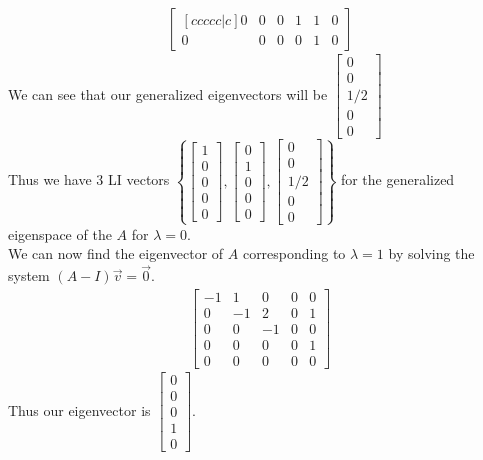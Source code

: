 \documentclass[answers,12pt,addpoints]{exam}
\begin{document}
\begin{questions}
\begin{solution}
\begin{align*}
\begin{bmatrix}[ccccc|c]
                0 & 0 & 0 & 1 & 1 & 0 \\
                0 & 0 & 0 & 0 & 1 & 0
            \end{bmatrix}
        \end{align*}
        We can see that our generalized eigenvectors will be $\begin{bmatrix}
            0 \\ 0 \\ 1/2 \\ 0 \\ 0
        \end{bmatrix}$\\
        Thus we have 3 LI vectors $\left\{ \begin{bmatrix} 1\\ 0\\ 0\\ 0\\ 0 \end{bmatrix}, \begin{bmatrix} 0\\ 1\\ 0\\ 0\\ 0 \end{bmatrix}, \begin{bmatrix} 0\\ 0\\ 1/2\\ 0\\ 0 \end{bmatrix} \right\}$ for the generalized eigenspace of the $A$ for $\lambda = 0$. \\
        We can now find the eigenvector of $A$ corresponding to $\lambda = 1$ by solving the system $(A - I)\vec{v} = \vec{0}$.
        \begin{align*}
            \begin{bmatrix}
                -1 & 1 & 0 & 0 & 0 \\
                0 & -1 & 2 & 0 & 1 \\
                0 & 0 & -1 & 0 & 0 \\
                0 & 0 & 0 & 0 & 1 \\
                0 & 0 & 0 & 0 & 0
            \end{bmatrix}
        \end{align*}
        Thus our eigenvector is $\begin{bmatrix} 0 \\ 0 \\ 0\\ 1\\ 0 \end{bmatrix}$. \\

\end{solution}
\end{questions}
\end{document}
